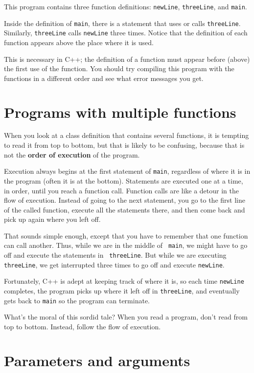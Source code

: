This program contains three function definitions: {\tt newLine},
{\tt threeLine}, and {\tt main}.

Inside the definition of {\tt main}, there is a statement that
uses or calls {\tt threeLine}.  Similarly, {\tt threeLine} calls
{\tt newLine} three times.  Notice that the definition of each
function appears above the place where it is used.

This is necessary in C++; the definition of a function must
appear before (above) the first use of the function.  You
should try compiling this program with the functions in a
different order and see what error messages you get.

\section {Programs with multiple functions}

When you look at a class definition that contains several functions, it
is tempting to read it from top to bottom, but that is likely to be
confusing, because that is not the {\bf order of execution} of the
program.

Execution always begins at the first statement of {\tt main},
regardless of where it is in the program (often it is at the bottom).
Statements are executed one at a time, in order, until you reach a
function call.  Function calls are like a detour in the flow of
execution.  Instead of going to the next statement, you go to the
first line of the called function, execute all the statements there,
and then come back and pick up again where you left off.

That sounds simple enough, except that you have to remember that one
function can call another.  Thus, while we are in the middle of {\tt
main}, we might have to go off and execute the statements in {\tt
threeLine}.  But while we are executing {\tt threeLine}, we get
interrupted three times to go off and execute {\tt newLine}.

Fortunately, C++ is adept at keeping track of where it is, so
each time {\tt newLine} completes, the program picks up where it left
off in {\tt threeLine}, and eventually gets back to {\tt main} so the
program can terminate.

What's the moral of this sordid tale?  When you read a program, don't
read from top to bottom.  Instead, follow the flow of execution.

\section {Parameters and arguments}


